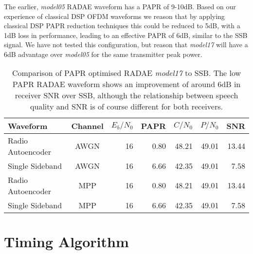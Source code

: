 \documentclass{article}
\begin{document}
The earlier, \emph{model05} RADAE waveform has a PAPR of 9-10dB.  Based on our experience of classical DSP OFDM waveforms we reason that by applying classical DSP PAPR reduction techniques this could be reduced to 5dB, with a 1dB loss in performance, leading to an effective PAPR of 6dB, similar to the SSB signal.  We have not tested this configuration, but reason that \emph{model17} will have a 6dB advantage over \emph{model05} for the same transmitter peak power.

\begin{table} [H]
\centering
\begin{tabular}{l c r r r r r}
 \hline
 Waveform             & Channel & $E_b/N_0$ & PAPR & $C/N_0$ & $P/N_0$ & SNR \\
 \hline
 Radio Autoencoder    & AWGN & 16 & 0.80 & 48.21 & 49.01 & 13.44 \\
 Single Sideband      & AWGN & 16 & 6.66 & 42.35 & 49.01 & 7.58  \\
 Radio Autoencoder    & MPP & 16 & 0.80 & 48.21 & 49.01 & 13.44 \\
 Single Sideband      & MPP & 16 & 6.66 & 42.35 & 49.01 & 7.58  \\
 \hline
\end{tabular}
\caption{Comparison of PAPR optimised RADAE \emph{model17} to SSB. The low PAPR RADAE waveform shows an improvement of around 6dB in receiver SNR over SSB, although the relationship between speech quality and SNR is of course different for both receivers.}
\label{tab:papr_ssb}
\end{table}

\section{Timing Algorithm}
\end{document}
